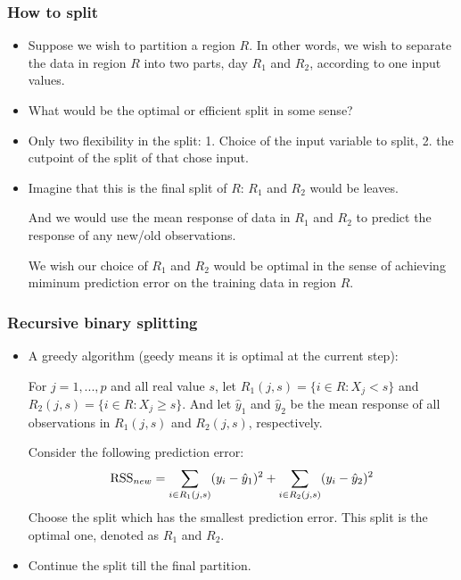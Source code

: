 \documentclass{beamer}
\begin{document}
   \begin{frame}
   	\frametitle{How to split}
   	\begin{itemize}
   		\item  Suppose we wish to partition a region $R$. In other words, we wish to separate
   		the data in region $R$ into two parts, day $R_1$ and $R_2$, according to one input values.
   		
   		\item What would be the optimal or efficient split in some sense?
   		\item Only two flexibility in the split: 1. Choice of the input variable to split, 
   		2. the cutpoint of the split of that chose input.
   		
   		\item Imagine that this is the final split of $R$:  $R_1$ and $R_2$ would be leaves.
   		 
   		 And we would use the mean response of data in $R_1 $ and $R_2$ to predict the response
   		 of any new/old observations.
   		 
   		 We wish our choice of $R_1$ and $R_2$ would be optimal in the sense of achieving miminum prediction error on the training
   		 data in region $R$.  
   				
   			\end{itemize}
   		\end{frame} 
   	 \begin{frame}
   	 	\frametitle{Recursive binary splitting}
   	 	\begin{itemize}	
        \item A greedy algorithm (geedy means it is optimal at the current step):
        
        For $j=1, ..., p$ and all real value $s$, 
        let $R_1(j, s)= \{i \in R: X_j < s \}$ and $ R_2(j, s) = \{i \in R: X_j \geq s\}$.
        And let $\hat y_1 $ and $\hat y_2$ be the mean response of all observations  in $R_1(j, s)$ and $R_2(j, s)$, respectively.
        
        Consider the following prediction error:
        $$\hbox{RSS}_{new}= \sum_{i\in R_1(j, s)} (y_i - \hat y_1)^2 + \sum_{i \in R_2(j, s) } (y_i - \hat y_2)^2$$
        Choose the split  which has the smallest prediction error. This split is the optimal one, denoted as
        $R_1$ and $R_2$. 
   	  
   	 \item Continue the split till the final partition. 
   	 
   		
   	\end{itemize}
   \end{frame} 
   
\end{document}
